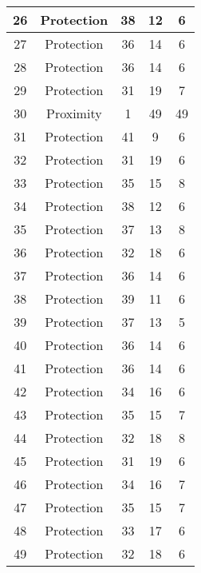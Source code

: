 \documentclass[results.tex]{subfiles}
\begin{document}
\begin{center}
\begin{tabular}{| c || c | c | c | c |}
    \hline
    26 & Protection & 38 & 12 & 6 \\ 
    \hline
    27 & Protection & 36 & 14 & 6 \\ 
    \hline
    28 & Protection & 36 & 14 & 6 \\ 
    \hline
    29 & Protection & 31 & 19 & 7 \\ 
    \hline
    30 & Proximity & 1 & 49 & 49 \\ 
    \hline
    31 & Protection & 41 & 9 & 6 \\ 
    \hline
    32 & Protection & 31 & 19 & 6 \\ 
    \hline
    33 & Protection & 35 & 15 & 8 \\ 
    \hline
    34 & Protection & 38 & 12 & 6 \\ 
    \hline
    35 & Protection & 37 & 13 & 8 \\ 
    \hline
    36 & Protection & 32 & 18 & 6 \\ 
    \hline
    37 & Protection & 36 & 14 & 6 \\ 
    \hline
    38 & Protection & 39 & 11 & 6 \\ 
    \hline
    39 & Protection & 37 & 13 & 5 \\ 
    \hline
    40 & Protection & 36 & 14 & 6 \\ 
    \hline
    41 & Protection & 36 & 14 & 6 \\ 
    \hline
    42 & Protection & 34 & 16 & 6 \\ 
    \hline
    43 & Protection & 35 & 15 & 7 \\ 
    \hline
    44 & Protection & 32 & 18 & 8 \\ 
    \hline
    45 & Protection & 31 & 19 & 6 \\ 
    \hline
    46 & Protection & 34 & 16 & 7 \\ 
    \hline
    47 & Protection & 35 & 15 & 7 \\ 
    \hline
    48 & Protection & 33 & 17 & 6 \\ 
    \hline
    49 & Protection & 32 & 18 & 6 \\ 
    \hline   \end{tabular}
\end{center}
\end{document}
